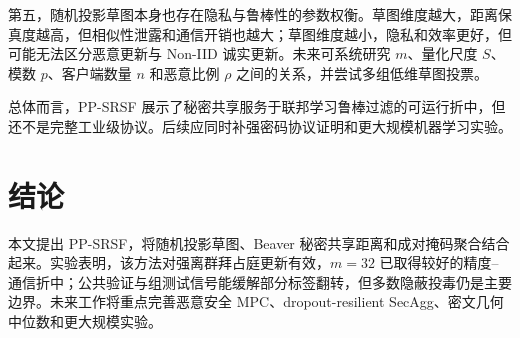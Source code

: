\documentclass[final]{jcr}
\begin{document}
第五，随机投影草图本身也存在隐私与鲁棒性的参数权衡。草图维度越大，距离保真度越高，但相似性泄露和通信开销也越大；草图维度越小，隐私和效率更好，但可能无法区分恶意更新与 Non-IID 诚实更新。未来可系统研究 $m$、量化尺度 $S$、模数 $p$、客户端数量 $n$ 和恶意比例 $\rho$ 之间的关系，并尝试多组低维草图投票。

总体而言，PP-SRSF 展示了秘密共享服务于联邦学习鲁棒过滤的可运行折中，但还不是完整工业级协议。后续应同时补强密码协议证明和更大规模机器学习实验。

\section{结论}
本文提出 PP-SRSF，将随机投影草图、Beaver 秘密共享距离和成对掩码聚合结合起来。实验表明，该方法对强离群拜占庭更新有效，$m=32$ 已取得较好的精度--通信折中；公共验证与组测试信号能缓解部分标签翻转，但多数隐蔽投毒仍是主要边界。未来工作将重点完善恶意安全 MPC、dropout-resilient SecAgg、密文几何中位数和更大规模实验。



\end{document}
